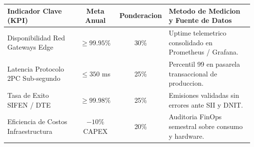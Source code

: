 \documentclass[11pt,a4paper]{article}
\begin{document}
\noindent
\begin{tabularx}{\linewidth}{@{} p{4.2cm} c c X @{}}
  \toprule
  \rowcolor{corpDarkHeader}
  {\bfseries\color{white}\scriptsize Indicador Clave (KPI)} &
  {\bfseries\color{white}\scriptsize Meta Anual} &
  {\bfseries\color{white}\scriptsize Ponderacion} &
  {\bfseries\color{white}\scriptsize Metodo de Medicion y Fuente de Datos} \\
  \midrule
  \rowcolor{corpLightBg}
  Disponibilidad Red Gateways Edge & $\ge 99.95\%$ & 30\% & Uptime telemetrico consolidado en Prometheus / Grafana. \\
  Latencia Protocolo 2PC Sub-segundo & $\le 350$ ms & 25\% & Percentil 99 en pasarela transaccional de produccion. \\
  \rowcolor{corpLightBg}
  Tasa de Exito SIFEN / DTE & $\ge 99.98\%$ & 25\% & Emisiones validadas sin errores ante SII y DNIT. \\
  Eficiencia de Costos Infraestructura & $-10\%$ CAPEX & 20\% & Auditoria FinOps semestral sobre consumo y hardware. \\
  \bottomrule
\end{tabularx}

\vspace{2.5mm}

\vspace{1mm}
\end{document}
